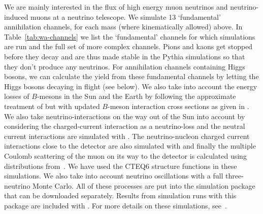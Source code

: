 We are mainly interested in the flux of high energy muon neutrinos
     and neutrino-induced muons at a neutrino telescope.  We simulate 13
     `fundamental' annihilation channels,      
for each mass
     (where kinematically allowed) above. In Table~\ref{tab:wa-channels} we list the `fundamental' channels for which simulations are run and the full set of more complex channels.
     Pions and kaons get stopped
     before they decay and are thus made stable in the {\sc Pythia}
     simulations so that they don't produce any neutrinos.  For
     annihilation channels containing Higgs bosons, we can calculate
     the yield from these fundamental channels by letting the Higgs
     bosons decaying in flight (see below).  We also take into account
     the energy losses of $B$-mesons in the Sun and the Earth by
     following the approximate treatment of \cite{RS} but with updated
     $B$-meson interaction cross sections as given in
     \cite{joakimthesis}.  We also take neutrino-interactions on the
     way out of the Sun into account by considering the charged-current
     interaction as a neutrino-loss and the neutral current
     interactions are simulated with  \cite{nusigma}.  The
     neutrino-nucleon charged current interactions close to the
     detector are also simulated with  and finally the
     multiple Coulomb scattering of the muon on its way to the detector
     is calculated using distributions from~\cite{PDG}. We have used the CTEQ6
     structure functions in these simulations.
     We also take into account neutrino oscillations with a full three-neutrino Monte Carlo. All of these processes are put into the simulation package   that can be downloaded separately. Results from simulation runs with this package are included with \ds.
     For more details on these simulations, see~\cite{wimpnu}.
     
